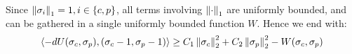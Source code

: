 Since $\left \Vert \sigma_i \right \Vert_1=1, i \in \{c,p\}$, all terms involving $\left \Vert \cdot \right \Vert_1$ are uniformly bounded, and can be gathered in a single uniformly bounded function $W$. Hence we end with:
\begin{equation}
    \left \langle -dU(\sigma_c,\sigma_p),(\sigma_c-1, \sigma_p-1) \right \rangle \geq C_1 \left \Vert \sigma_c \right \Vert_2^2 + C_2 \left \Vert \sigma_p \right \Vert_2^2 - W(\sigma_c,\sigma_p)
\end{equation}
